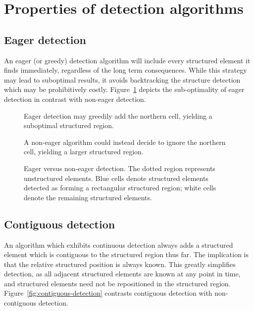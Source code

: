 \section{Properties of detection algorithms}

\subsection{Eager detection}
An eager (or greedy) detection algorithm will include every structured element it finds immediately, regardless of the long term consequences. While this strategy may lead to suboptimal results, it avoids backtracking the structure detection which may be prohibitively costly. Figure~\ref{fig:eager-detection} depicts the sub-optimality of eager detection in contrast with non-eager detection.


\begin{figure}

\sidebyside
{
	\drawmatrix[cell wd=0.6, cell ht=0.6]{\eagermatrix}
	\caption{Eager detection may greedily add the northern cell, yielding a suboptimal structured region.}
}
{
	\drawmatrix[cell wd=0.6, cell ht=0.6]{\noneagermatrix}
	\caption{A non-eager algorithm could instead decide to ignore the northern cell, yielding a larger structured region.}
}
\caption{Eager versus non-eager detection. The dotted region represents unstructured elements. Blue cells denote structured elements detected as forming a rectangular structured region; white cells denote the remaining structured elements.\label{fig:eager-detection}}
\end{figure}



\subsection{Contiguous detection}
\label{subsec:contiguous-detection}
An algorithm which exhibits continuous detection always adds a structured element which is contiguous to the structured region thus far. The implication is that the relative structured position is always known. This greatly simplifies detection, as all adjacent structured elements are known at any point in time, and structured elements need not be repositioned in the structured region. Figure~\ref{fig:contiguous-detection} contrasts contiguous detection with non-contiguous detection.

